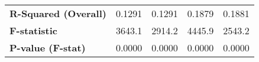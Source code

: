 {\begin{longtable}{>{\bfseries}lcccc}
\textbf{R-Squared (Overall)}               &        0.1291       &             0.1291             &        0.1879       &              0.1881              \\
\textbf{F-statistic}                       &        3643.1       &             2914.2             &        4445.9       &              2543.2              \\
\textbf{P-value (F-stat)}                  &        0.0000       &             0.0000             &        0.0000       &              0.0000              \\
\bottomrule
\end{longtable}
}


